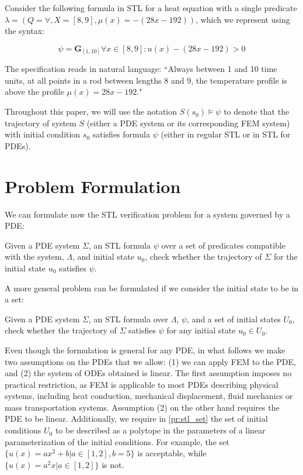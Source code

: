 \documentclass[oribibl]{llncs/llncs}
\newcommand{\Always}{\mathbf{G}}
\begin{document}
\begin{example}
    \label{ex:stl}

    Consider the following formula in STL for a heat equation with a single predicate
    $\lambda = (Q = \forall, X = [8, 9], \mu(x) = -(28x - 192))$, which we 
    represent using the syntax:

    \begin{equation}
        \psi = \Always_{[1,10]} \forall x \in [8,9] : u(x) - (28x - 192) > 0
    \end{equation}

    The specification reads in natural language: ``Always between 1 and 10 time
    units, at all points in a rod between lengths 8 and 9, the temperature
    profile is above the profile $\mu(x) = 28x - 192$."

\end{example}

Throughout this paper, we will use the notation $S(s_0) \models \psi$ to denote
that the trajectory of system $S$ (either a PDE system or its corresponding FEM
system) with initial condition $s_0$ satisfies formula $\psi$ (either in regular STL or in
STL for PDEs).

\section{Problem Formulation}
\label{sec:problem_formulation}

We can formulate now the STL verification problem for a system governed by a
PDE:

\begin{problem}
\label{pr:stl}
    Given a PDE system $\Sigma$, an STL formula $\psi$ over a set of predicates
    compatible with the system, $\Lambda$, and initial state $u_0$,
    check whether the trajectory of $\Sigma$ for the initial state $u_0$
    satisfies $\psi$.
\end{problem}

A more general problem can be formulated if we consider the initial state to be
in a set:

\begin{problem}
\label{pr:stl_set}
    Given a PDE system $\Sigma$, an STL formula over $\Lambda$, $\psi$, and a set of initial states
    $U_0$, check whether the trajectory of $\Sigma$ satisfies $\psi$ 
    for any initial state $u_0 \in U_0$.
\end{problem}

Even though the formulation is general for any PDE, in what follows we make two
assumptions on the PDEs that we allow: (1) we can apply FEM to the PDE, and (2)
the system of ODEs obtained is linear. The first assumption imposes no practical
restriction, as FEM is applicable to most PDEs describing physical systems,
including heat conduction, mechanical displacement, fluid mechanics or
mass transportation systems. Assumption (2) on the other hand requires the PDE
to be linear. Additionally, we require in \cref{pr:stl_set} the set of initial
conditions $U_0$ to be described as a polytope in the parameters of a
linear parameterization of the initial conditions. For example, the set $\{u(x)
= a x^2 + b | a \in [1,2], b = 5\}$ is acceptable, while $\{u(x) = a^2 x |
a \in [1,2]\}$ is not.
\end{document}
